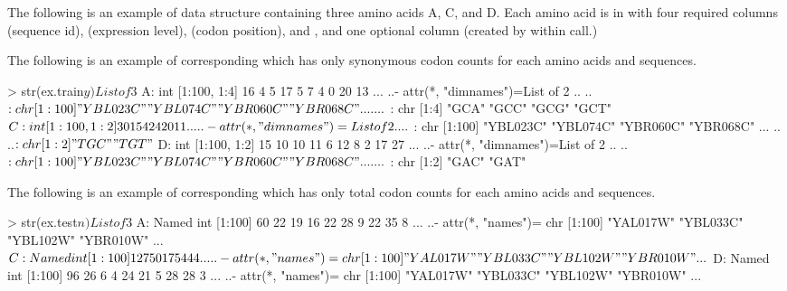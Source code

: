 The following is an example of  data structure containing
three amino acids A, C, and D. Each amino acid is in 
with four required columns  (sequence id),  (expression
level),  (codon position),
and , and one optional column  (created by
 within  call.)

The following is an example of corresponding  which has only
synonymous codon counts for each amino acids and sequences.
\begin{Code}[title=Example of \code{y}]
> str(ex.train$y)
List of 3
 $ A: int [1:100, 1:4] 16 4 5 17 5 7 4 0 20 13 ...
  ..- attr(*, "dimnames")=List of 2
  .. ..$ : chr [1:100] "YBL023C" "YBL074C" "YBR060C" "YBR068C" ...
  .. ..$ : chr [1:4] "GCA" "GCC" "GCG" "GCT"
 $ C: int [1:100, 1:2] 3 0 1 5 4 2 4 2 0 11 ...
  ..- attr(*, "dimnames")=List of 2
  .. ..$ : chr [1:100] "YBL023C" "YBL074C" "YBR060C" "YBR068C" ...
  .. ..$ : chr [1:2] "TGC" "TGT"
 $ D: int [1:100, 1:2] 15 10 10 11 6 12 8 2 17 27 ...
  ..- attr(*, "dimnames")=List of 2
  .. ..$ : chr [1:100] "YBL023C" "YBL074C" "YBR060C" "YBR068C" ...
  .. ..$ : chr [1:2] "GAC" "GAT"
\end{Code}

The following is an example of corresponding  which has only
total codon counts for each amino acids and sequences.
\begin{Code}[title=Example of \code{n}]
> str(ex.test$n)
List of 3
 $ A: Named int [1:100] 60 22 19 16 22 28 9 22 35 8 ...
  ..- attr(*, "names")= chr [1:100] "YAL017W" "YBL033C" "YBL102W" "YBR010W" ...
 $ C: Named int [1:100] 12 7 5 0 1 7 5 4 4 4 ...
  ..- attr(*, "names")= chr [1:100] "YAL017W" "YBL033C" "YBL102W" "YBR010W" ...
 $ D: Named int [1:100] 96 26 6 4 24 21 5 28 28 3 ...
  ..- attr(*, "names")= chr [1:100] "YAL017W" "YBL033C" "YBL102W" "YBR010W" ...
\end{Code}


